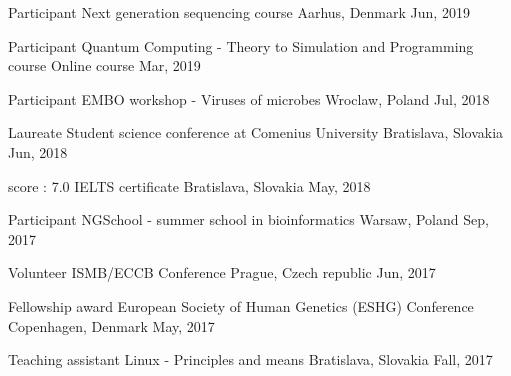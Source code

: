 
\begin{cventries}

    \cventry
        {Participant}
        {Next generation sequencing course}
        {Aarhus, Denmark}
        {Jun, 2019}
        {}

    \cventry
        {Participant} %
        {Quantum Computing - Theory to Simulation and Programming course} %
        {Online course} %
        {Mar, 2019} %
        {}

    \cventry
        {Participant}
        {EMBO workshop - Viruses of microbes}
        {Wroclaw, Poland}
        {Jul, 2018}
        {}
    
    \cventry
        {Laureate} %
        {Student science conference at Comenius University} %
        {Bratislava, Slovakia} %
        {Jun, 2018} %
        {}
  
    \cventry
        {score : 7.0}
        {IELTS certificate}
        {Bratislava, Slovakia}
        {May, 2018}
        {}
    
    \cventry
        {Participant} %
        {NGSchool - summer school in bioinformatics} %
        {Warsaw, Poland} %
        {Sep, 2017} %
        {}

    \cventry
        {Volunteer} %
        {ISMB/ECCB Conference} %
        {Prague, Czech republic} %
        {Jun, 2017} %
        {}

    \cventry
        {Fellowship award} %
        {European Society of Human Genetics (ESHG) Conference} %
        {Copenhagen, Denmark} %
        {May, 2017} %
        {}
    
    \cventry
        {Teaching assistant} %
        {Linux - Principles and means} %
        {Bratislava, Slovakia} %
        {Fall, 2017} %
        {}

\end{cventries}
